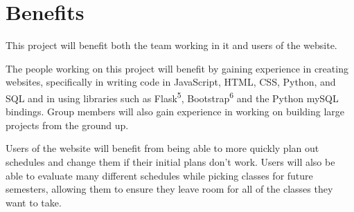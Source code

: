 \section{Benefits}
This project will benefit both the team working in it and users of the website.

The people working on this project will benefit by gaining experience in
creating websites, specifically in writing code in JavaScript, HTML, CSS,
Python, and SQL and in using libraries such as Flask\textsuperscript{5}, Bootstrap\textsuperscript{6} and the Python
mySQL bindings.  Group members will also gain experience in working on building
large projects from the ground up.

Users of the website will benefit from being able to more quickly plan out
schedules and change them if their initial plans don't work.  Users will also
be able to evaluate many different schedules while picking classes for future
semesters, allowing them to ensure they leave room for all of the classes they
want to take.

